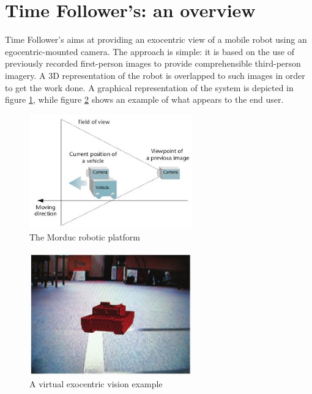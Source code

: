 \section{Time Follower's: an overview}
\label{exo:time_follower}

Time Follower's aims at providing an exocentric view of a mobile 
robot using an egocentric-mounted camera. The approach is simple: it is 
based on the use of previously recorded first-person images to provide 
comprehensible third-person imagery. A 3D representation of the robot 
is overlapped to such images in order to get the work done. A graphical
representation of the system is depicted in figure \ref{fig:exocentric}, 
while figure \ref{fig:virtualexocentric} shows an example of what appears 
to the end user.

\begin{figure}[!h]
  \begin{center}
    \includegraphics[width=200pt]{img/exocentric_vision.jpg}
    \caption{The Morduc robotic platform}
    \label{fig:exocentric}
  \end{center}
\end{figure}

\begin{figure}[!h]
  \begin{center}
    \includegraphics[width=200pt]{img/virtual_exocentric.jpg}  %
    \caption{A virtual exocentric vision example}
    \label{fig:virtualexocentric}
  \end{center}
\end{figure}

